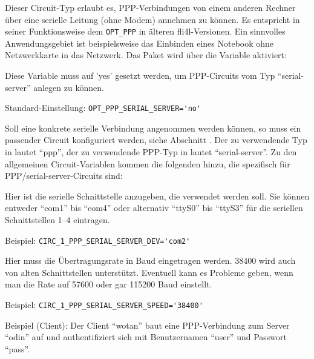 Dieser Circuit-Typ erlaubt es, PPP-Verbindungen von einem anderen Rechner über
eine serielle Leitung (ohne Modem) annehmen zu können. Es entspricht in seiner
Funktionsweise dem \verb+OPT_PPP+ in älteren fli4l-Versionen. Ein sinnvolles
Anwendungsgebiet ist beispielsweise das Einbinden eines Notebook ohne
Netzwerkkarte in das Netzwerk. Das Paket wird über die Variable
 aktiviert:

\begin{description}

Diese Variable muss auf 'yes' gesetzt werden, um PPP-Circuits vom Typ
``serial-server'' anlegen zu können.

Standard-Einstellung: \verb+OPT_PPP_SERIAL_SERVER='no'+
\end{description}

Soll eine konkrete serielle Verbindung angenommen werden können, so muss ein
passender Circuit konfiguriert werden, siehe Abschnitt
. Der zu verwendende Typ in
 lautet ``ppp'', der zu verwendende PPP-Typ in
 lautet ``serial-server''. Zu den allgemeinen
Circuit-Variablen kommen die folgenden hinzu, die spezifisch für
PPP/serial-server-Circuits sind:

\begin{description}


Hier ist die serielle Schnittstelle anzugeben, die verwendet werden soll. Sie
können entweder ``com1'' bis ``com4'' oder alternativ ``ttyS0'' bis ``ttyS3''
für die seriellen Schnittstellen 1--4 eintragen.

Beispiel: \verb+CIRC_1_PPP_SERIAL_SERVER_DEV='com2'+


Hier muss die Übertragungsrate in Baud eingetragen werden. 38400 wird auch von
alten Schnittstellen unterstützt. Eventuell kann es Probleme geben, wenn man die
Rate auf 57600 oder gar 115200 Baud einstellt.

Beispiel: \verb+CIRC_1_PPP_SERIAL_SERVER_SPEED='38400'+

\end{description}

Beispiel (Client): Der Client ``wotan'' baut eine PPP-Verbindung zum Server
``odin'' auf und authentifiziert sich mit Benutzernamen ``user'' und Passwort
``pass''.

